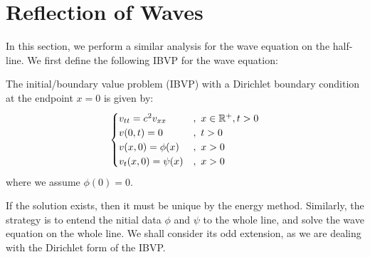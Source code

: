 \section{Reflection of Waves}

In this section, we perform a similar analysis for the wave equation on the half-line. We first define the following IBVP for the wave equation:

\medskip 

\begin{defn} 
    The initial/boundary value problem (IBVP) with a Dirichlet boundary condition at the endpoint $x=0$ is given by:
    \begin{align*}
        \begin{cases}
            v_{tt} = c^2 v_{xx} &,\ x\in{\mathbb R}^+, t > 0 \\
            v(0,t) = 0 &,\ t > 0 \\
            v(x,0) = \phi(x) &,\ x > 0 \\
            v_t(x,0) = \psi(x) &,\ x > 0
        \end{cases}
    \end{align*}
    where we assume $\phi(0)=0$.
\end{defn}

If the solution exists, then it must be unique by the energy method. Similarly, the strategy is to entend the nitial data $\phi$ and $\psi$ to the whole line, and solve the wave equation on the whole line. We shall consider its odd extension, as we are dealing with the Dirichlet form of the IBVP.

\medskip 

